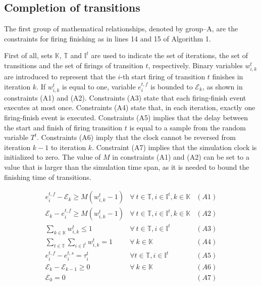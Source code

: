 \documentclass[suppldata]{interact}
\theoremstyle{plain}
\theoremstyle{definition}
\theoremstyle{remark}
\begin{document}
\subsection{Completion of transitions}

The first group of mathematical relationships, denoted by group--A, are the constraints for firing %
finishing as in lines 14 and 15 of Algorithm 1. 

First of all, sets $\mathbb{K}$, $\mathbb{T}$ and $\mathbb{I}^t$ are used to indicate the set of iterations, the set of transitions and the set of firings of transition $t$, respectively.
Binary variables $w^{t}_{i,k}$ are introduced to represent that the $i$-th start firing of transition $t$ finishes in iteration $k$. If $w^{t}_{i,k}$  is equal to one, %
variable $e^{t,f}_{i}$ is bounded to $\mathcal{E}_k$, as shown in constraints (A1) and (A2). Constraints (A3) state that each firing-finish event executes at most once. Constraints (A4) state that, in each iteration, exactly one firing-finish event is executed. Constraints (A5) implies that the delay between the start and finish of firing transition $t$ is equal to a sample from the random variable $T^{t}$. Constraints (A6) imply that the clock cannot be reversed from iteration $k-1$ to iteration $k$. Constraint (A7) implies that the simulation clock is initialized to zero. The value of $M$ in constraints (A1) and (A2) can be set to a value that is larger than the simulation time span, as it is needed to bound the finishing time of transitions.

\begin{eqnarray}
	e^{t,f}_i-\mathcal{E}_k\ge M(w^{t}_{i,k}-1) & \forall\ t\in\mathbb{T},i\in \mathbb{I}^{t},k\in \mathbb{K}&(A1)\nonumber\\
	\mathcal{E}_k-e^{t,f}_i\ge M(w^{t}_{i,k}-1) & \forall\ t\in\mathbb{T},i\in \mathbb{I}^{t},k\in \mathbb{K}&(A2)\nonumber\\
	\sum_{k\in \mathbb{K}} w^{t}_{i,k} \le 1& \forall\ t\in\mathbb{T},i\in \mathbb{I}^{t}&(A3)\nonumber\\
	\sum_{t\in \mathbb{T}}\sum_{i\in \mathbb{I}^{t}} w^{t}_{i,k} =1&\forall\ k\in \mathbb{K}&(A4)\nonumber\\
	e^{t,f}_{i} - e^{t,s}_{i} = \tau^{t}_{i} & \forall t\in\mathbb{T}, i\in \mathbb{I}^{t}&(A5) \nonumber\\
	\mathcal{E}_{k}-\mathcal{E}_{k-1}\ge 0&\forall\ k\in \mathbb{K}&(A6)\nonumber\\
	\mathcal{E}_0 = 0&&(A7)\nonumber
\end{eqnarray}
\end{document}

